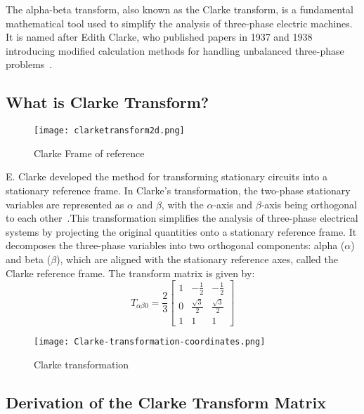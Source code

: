 The alpha-beta transform, also known as the Clarke transform, is a fundamental
mathematical tool used to simplify the analysis of three-phase electric
machines. It is named after Edith Clarke, who published papers in 1937 and 1938
introducing modified calculation methods for handling unbalanced three-phase
problems~\cite{E. Clarke}.

\subsection{What is Clarke Transform?}
\begin{figure}[h]
    \centering
    \texttt{[image: clarketransform2d.png]}
    \caption{Clarke Frame of reference}
    \label{fig:Clarke Frame of reference}
\end{figure}

E. Clarke developed the method for transforming stationary circuits into a
stationary reference frame. In Clarke’s transformation, the two-phase
stationary variables are represented as $\alpha$ and $\beta$, with the
$\alpha$-axis and $\beta$-axis being orthogonal to each other~\cite{DSP-Based
    Electromechanical Motion Control}.This transformation simplifies the analysis
of three-phase electrical systems by projecting the original quantities onto a
stationary reference frame. It decomposes the three-phase variables into two
orthogonal components: alpha ($\alpha$) and beta ($\beta$), which are aligned
with the stationary reference axes, called the Clarke reference frame. The
transform matrix is given by:
\begin{equation*}
    T_{\alpha\beta0} = \frac{2}{3}
    \begin{bmatrix}
        1 & -\frac{1}{2}       & -\frac{1}{2}       \\
        0 & \frac{\sqrt{3}}{2} & \frac{\sqrt{3}}{2} \\
        1 & 1                  & 1
    \end{bmatrix}
\end{equation*}
\begin{figure}[h]
    \centering
    \texttt{[image: Clarke-transformation-coordinates.png]}
    \caption{Clarke transformation}
    \label{fig:Clarke transformation}
\end{figure}

\subsection{Derivation of the Clarke Transform Matrix}

